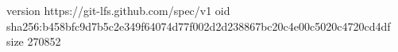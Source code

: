 version https://git-lfs.github.com/spec/v1
oid sha256:b458bfc9d7b5c2e349f64074d77f002d2d238867bc20c4e00c5020c4720cd4df
size 270852
